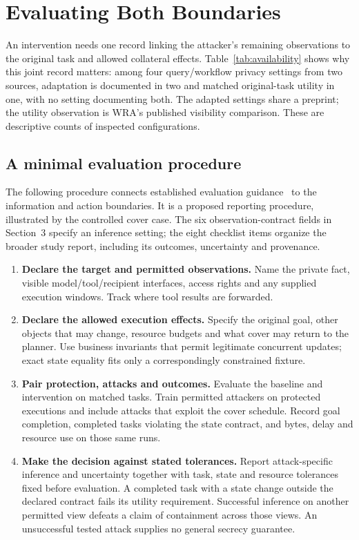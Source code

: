 \section{Evaluating Both Boundaries}\label{sec:reporting}
An intervention needs one record linking the attacker's remaining observations to the original task and allowed collateral effects. Table~\ref{tab:availability} shows why this joint record matters: among four query/workflow privacy settings from two sources, adaptation is documented in two and matched original-task utility in one, with no setting documenting both. The adapted settings share a preprint; the utility observation is WRA's published visibility comparison. These are descriptive counts of inspected configurations.



\subsection{A minimal evaluation procedure}
The following procedure connects established evaluation guidance~\cite{arp2022dos,juarez2014critical,mathews2023critical} to the information and action boundaries. It is a proposed reporting procedure, illustrated by the controlled cover case. The six observation-contract fields in Section~3 specify an inference setting; the eight checklist items organize the broader study report, including its outcomes, uncertainty and provenance.

\begin{enumerate}
\item \textbf{Declare the target and permitted observations.} Name the private fact, visible model/tool/recipient interfaces, access rights and any supplied execution windows. Track where tool results are forwarded.
\item \textbf{Declare the allowed execution effects.} Specify the original goal, other objects that may change, resource budgets and what cover may return to the planner. Use business invariants that permit legitimate concurrent updates; exact state equality fits only a correspondingly constrained fixture.
\item \textbf{Pair protection, attacks and outcomes.} Evaluate the baseline and intervention on matched tasks. Train permitted attackers on protected executions and include attacks that exploit the cover schedule. Record goal completion, completed tasks violating the state contract, and bytes, delay and resource use on those same runs.
\item \textbf{Make the decision against stated tolerances.} Report attack-specific inference and uncertainty together with task, state and resource tolerances fixed before evaluation. A completed task with a state change outside the declared contract fails its utility requirement. Successful inference on another permitted view defeats a claim of containment across those views. An unsuccessful tested attack supplies no general secrecy guarantee.
\end{enumerate}

